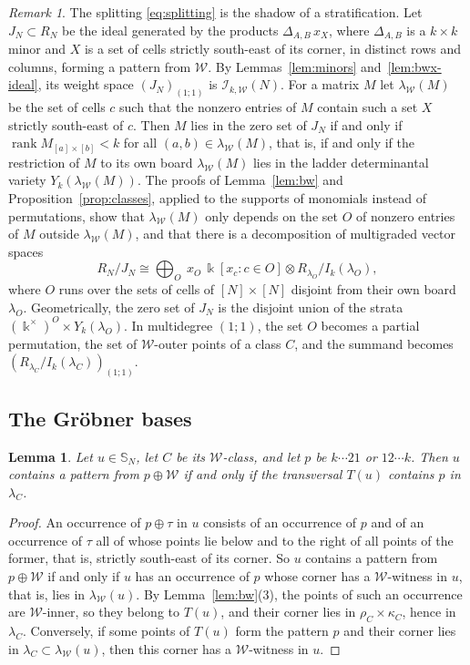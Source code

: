 \documentclass[11pt]{amsart}
\newtheorem{lemma}[theorem]{Lemma}
\theoremstyle{definition}
\theoremstyle{remark}
\newtheorem{remark}[theorem]{Remark}
\newcommand{\bS}{\mathbb{S}}
\newcommand{\kk}{\Bbbk}
\newcommand{\cI}{\mathscr{I}}
\newcommand{\cW}{\mathcal{W}}
\begin{document}
\begin{remark}\label{rem:strata}
	The splitting \eqref{eq:splitting} is the shadow of a stratification. Let $J_N\subset R_N$ be the ideal generated by the products $\Delta_{A,B}\,x_X$, where $\Delta_{A,B}$ is a $k\times k$ minor and $X$ is a set of cells strictly south-east of its corner, in distinct rows and columns, forming a pattern from $\cW$. By Lemmas~\ref{lem:minors} and~\ref{lem:bwx-ideal}, its weight space $(J_N)_{(1;1)}$ is $\cI_{k,\cW}(N)$. For a matrix $M$ let $\lambda_\cW(M)$ be the set of cells $c$ such that the nonzero entries of $M$ contain such a set $X$ strictly south-east of $c$. Then $M$ lies in the zero set of $J_N$ if and only if $\operatorname{rank}M_{[a]\times[b]}<k$ for all $(a,b)\in\lambda_\cW(M)$, that is, if and only if the restriction of $M$ to its own board $\lambda_\cW(M)$ lies in the ladder determinantal variety $Y_k(\lambda_\cW(M))$. The proofs of Lemma~\ref{lem:bw} and Proposition~\ref{prop:classes}, applied to the supports of monomials instead of permutations, show that $\lambda_\cW(M)$ only depends on the set $O$ of nonzero entries of $M$ outside $\lambda_\cW(M)$, and that there is a decomposition of multigraded vector spaces
	\[
	R_N/J_N\cong\bigoplus_O\ x_O\,\kk[x_c:c\in O]\otimes R_{\lambda_O}/I_k(\lambda_O),
	\]
	where $O$ runs over the sets of cells of $[N]\times[N]$ disjoint from their own board $\lambda_O$. Geometrically, the zero set of $J_N$ is the disjoint union of the strata $(\kk^\times)^O\times Y_k(\lambda_O)$. In multidegree $(1;1)$, the set $O$ becomes a partial permutation, the set of $\cW$-outer points of a class $C$, and the summand becomes $(R_{\lambda_C}/I_k(\lambda_C))_{(1;1)}$.
\end{remark}


\subsection{The Gr\"obner bases}\label{sec:BWX-proof}

\begin{lemma}\label{lem:bwx-chain}
Let $u\in\bS_N$, let $C$ be its $\cW$-class, and let $p$ be $k\cdots21$ or $12\cdots k$. Then $u$ contains a pattern from $p\oplus\cW$ if and only if the transversal $T(u)$ contains $p$ in $\lambda_C$.
\end{lemma}

\begin{proof}
An occurrence of $p\oplus\tau$ in $u$ consists of an occurrence of $p$ and of an occurrence of $\tau$ all of whose points lie below and to the right of all points of the former, that is, strictly south-east of its corner. So $u$ contains a pattern from $p\oplus\cW$ if and only if $u$ has an occurrence of $p$ whose corner has a $\cW$-witness in $u$, that is, lies in $\lambda_\cW(u)$. By Lemma~\ref{lem:bw}(3), the points of such an occurrence are $\cW$-inner, so they belong to $T(u)$, and their corner lies in $\rho_C\times\kappa_C$, hence in $\lambda_C$. Conversely, if some points of $T(u)$ form the pattern $p$ and their corner lies in $\lambda_C\subset\lambda_\cW(u)$, then this corner has a $\cW$-witness in $u$.
\end{proof}
\end{document}
